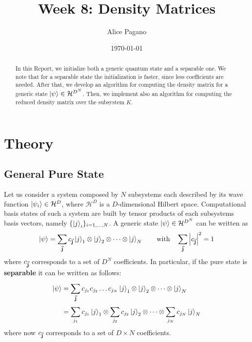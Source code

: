 \documentclass[rmp,10pt,onecolumn,fleqn,notitlepage]{revtex4-1}
\begin{document}
\title{Week 8: Density Matrices}
\author{Alice Pagano}
\date{\today}

\begin{abstract}
In this Report, we initialize both a generic quantum state and a separable one. We note that for a separable state the initialization is faster, since less coefficients are needed. After that, we develop an algorithm for computing the density matrix for a generic state \( \ket{\psi } \in \mathcal{H}^{D^N} \). Then, we implement also an algorithm for computing the reduced density matrix over the subsystem \( K \).
\end{abstract}

\maketitle


\section{Theory}

\subsection{General Pure State}
Let us consider a system composed by \( N \) subsystems each described by its wave function \( \ket{\psi _i} \in \mathcal{H}^D \), where \( \mathcal{H}^D \) is a \( D \)-dimensional Hilbert space. Computational basis states of such a system are built by tensor products of each subsystems basis vectors, namely \( \{ \ket{j}_i  \}_{i=1,\dots,N}   \).
A generic state \( \ket{\psi } \in \mathcal{H}^{D^N} \) can be written as
\begin{equation}
    \ket{\psi } = \sum_{\va{j}}^{} c_{\va{j}} \ket{j}_1 \otimes \ket{j}_2 \otimes \dots \otimes \ket{j}_N \qquad \text{with} \quad \sum_{\va{j}}^{} \abs{c_{\va{j}}}^2 = 1
\end{equation}
where \( c_{\va{j}} \) corresponds to a set of \( D^N \) coefficients. In particular, if the pure state is \textbf{separable } it can be written as follows:
\begin{equation}
\begin{split}
    \ket{\psi } &= \sum_{\va{j}}^{}  c_{j_1} c_{j_2} \dots c_{j_N} \ket{j}_1 \otimes \ket{j}_2 \otimes \dots \otimes \ket{j}_N \\
      &= \sum_{j_1}^{} c_{j_1} \ket{j}_1 \otimes \sum_{j_2}^{} c_{j_2} \ket{j}_2 \otimes \dots \otimes \sum_{j_N}^{} c_{j_N} \ket{j}_N
\end{split}
\end{equation}
where now  \( c_{\va{j}} \) corresponds to a set of \( D\times N \) coefficients.
\end{document}
